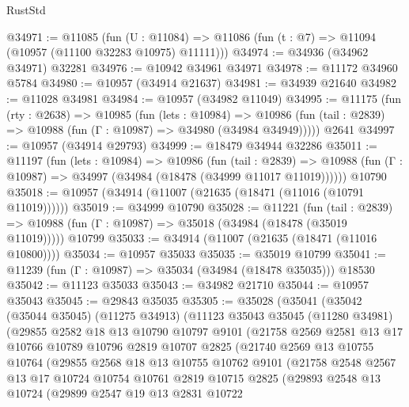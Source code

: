 \begin{lexlean}{RustStd}
\begin{coremodule}
@34971 := @11085
    (fun (U : @11084) => @11086 (fun (t : @7) => @11094 (@10957 (@11100 @32283 @10975) @11111)))
@34974 := @34936 (@34962 @34971) @32281
@34976 := @10942 @34961 @34971
@34978 := @11172 @34960 @5784
@34980 := @10957 (@34914 @21637)
@34981 := @34939 @21640
@34982 := @11028 @34981
@34984 := @10957 (@34982 @11049)
@34995 := @11175
    (fun (rty : @2638) =>
    @10985
      (fun (lets : @10984) =>
      @10986 (fun (tail : @2839) => @10988 (fun (Γ : @10987) => @34980 (@34984 @34949)))))
    @2641
@34997 := @10957 (@34914 @29793)
@34999 := @18479 @34944 @32286
@35011 := @11197
    (fun (lets : @10984) =>
    @10986
      (fun (tail : @2839) =>
      @10988 (fun (Γ : @10987) => @34997 (@34984 (@18478 (@34999 @11017 @11019))))))
    @10790
@35018 := @10957 (@34914 (@11007 (@21635 (@18471 (@11016 (@10791 @11019))))))
@35019 := @34999 @10790
@35028 := @11221
    (fun (tail : @2839) => @10988 (fun (Γ : @10987) => @35018 (@34984 (@18478 (@35019 @11019)))))
    @10799
@35033 := @34914 (@11007 (@21635 (@18471 (@11016 @10800))))
@35034 := @10957 @35033
@35035 := @35019 @10799
@35041 := @11239 (fun (Γ : @10987) => @35034 (@34984 (@18478 @35035))) @18530
@35042 := @11123 @35033
@35043 := @34982 @21710
@35044 := @10957 @35043
@35045 := @29843 @35035
@35305 := @35028
    (@35041
      (@35042
        (@35044 @35045)
        (@11275 @34913)
        (@11123
          @35043
          @35045
          (@11280 @34981)
          (@29855
            @2582
            @18
            @13
            @10790
            @10797
            @9101
            (@21758
              @2569
              @2581
              @13
              @17
              @10766
              @10789
              @10796
              @2819
              @10707
              @2825
              (@21740
                @2569
                @13
                @10755
                @10764
                (@29855
                  @2568
                  @18
                  @13
                  @10755
                  @10762
                  @9101
                  (@21758
                    @2548
                    @2567
                    @13
                    @17
                    @10724
                    @10754
                    @10761
                    @2819
                    @10715
                    @2825
                    (@29893
                      @2548
                      @13
                      @10724
                      (@29899
                        @2547
                        @19
                        @13
                        @2831
                        @10722

\end{coremodule}
\end{lexlean}
